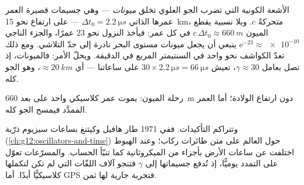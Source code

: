 \begin{example}\label{ex:g12:special-relativity:muons}
الأشعة الكونية التي تضرب الجو العلوي تخلق \emph{ميونات} ---
وهي جسيمات قصيرة العمر عمرها الذاتي $\Delta t_0 = \qty{2.2}{\micro s}$
--- على ارتفاع نحو \qty{15}{km}، متحركةً   $c$. وبلا نسبية يقطع الميون
$c\,\Delta t_0 \approx \qty{660}{m}$ في كل عمر: فيأخذ النزول
نحو $23$ عمرًا، والجزء الناجي
$\mathrm{e}^{-23} \approx \num{e-10}$ ينبغي أن يجعل ميونات مستوى البحر
نادرة إلى حدّ التلاشي. ومع ذلك تعدّ الكواشف نحو واحد في السنتيمتر المربع في
الدقيقة. ويحلّ  الأمر: فالميونات، إذ تصل بعامل $\gamma \approx 30$،
تعيش $30 \times \qty{2.2}{\micro s} = \qty{66}{\micro s}$ على
ساعاتنا --- أي  $\approx \qty{20}{km}$، وهو الجو كله.
\end{example}

\begin{omfigure}

{\small رحلة الميون: يموت عمر كلاسيكي واحد على بعد \qty{660}{m}
دون ارتفاع الولادة؛ أما العمر الممدَّد فيمسح الجو كله.}
\end{omfigure}

وتتراكم التأكيدات. ففي 1971 طار هافيل وكيتنغ بساعات سيزيوم ذرّية
(\cref{ch:g12:oscillators-and-time}) حول العالم على متن طائرات ركاب؛
وعند الهبوط اختلفت عن ساعات الأرض بأجزاء من الميكروثانية كما تنبّأ الحساب.
والمسرّعات تعوّل على التمدد يوميًّا، إذ تُدفع جسيماتها
إلى $\gamma$ فتنجو آلاف اللفّات التي لم تكن لتكملها
كلاسيكيًّا أبدًا. أما GPS فتجربة جارية لها ثمن.

